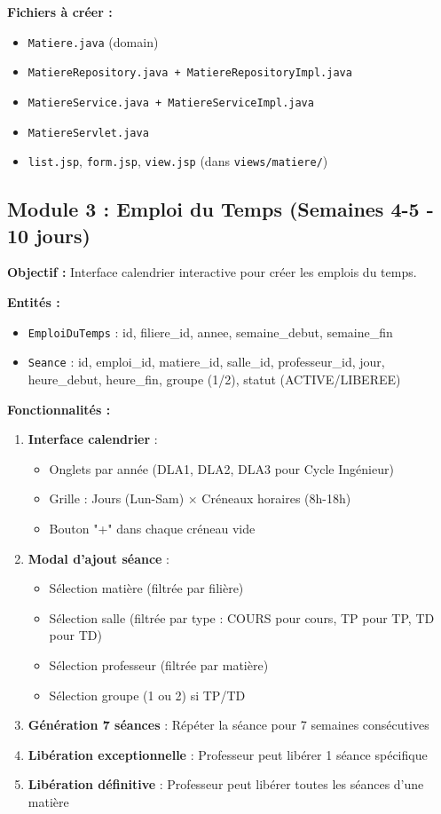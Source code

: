 \documentclass[11pt,a4paper]{article}
\begin{document}
\textbf{Fichiers à créer :}
\begin{itemize}
    \item \texttt{Matiere.java} (domain)
    \item \texttt{MatiereRepository.java + MatiereRepositoryImpl.java}
    \item \texttt{MatiereService.java + MatiereServiceImpl.java}
    \item \texttt{MatiereServlet.java}
    \item \texttt{list.jsp}, \texttt{form.jsp}, \texttt{view.jsp} (dans \texttt{views/matiere/})
\end{itemize}

\subsection{Module 3 : Emploi du Temps (Semaines 4-5 - 10 jours)}

\textbf{Objectif :} Interface calendrier interactive pour créer les emplois du temps.

\textbf{Entités :}
\begin{itemize}
    \item \texttt{EmploiDuTemps} : id, filiere\_id, annee, semaine\_debut, semaine\_fin
    \item \texttt{Seance} : id, emploi\_id, matiere\_id, salle\_id, professeur\_id, jour, heure\_debut, heure\_fin, groupe (1/2), statut (ACTIVE/LIBEREE)
\end{itemize}

\textbf{Fonctionnalités :}
\begin{enumerate}
    \item \textbf{Interface calendrier} :
    \begin{itemize}
        \item Onglets par année (DLA1, DLA2, DLA3 pour Cycle Ingénieur)
        \item Grille : Jours (Lun-Sam) × Créneaux horaires (8h-18h)
        \item Bouton "+" dans chaque créneau vide
    \end{itemize}
    \item \textbf{Modal d'ajout séance} :
    \begin{itemize}
        \item Sélection matière (filtrée par filière)
        \item Sélection salle (filtrée par type : COURS pour cours, TP pour TP, TD pour TD)
        \item Sélection professeur (filtrée par matière)
        \item Sélection groupe (1 ou 2) si TP/TD
    \end{itemize}
    \item \textbf{Génération 7 séances} : Répéter la séance pour 7 semaines consécutives
    \item \textbf{Libération exceptionnelle} : Professeur peut libérer 1 séance spécifique
    \item \textbf{Libération définitive} : Professeur peut libérer toutes les séances d'une matière
\end{enumerate}
\end{document}

